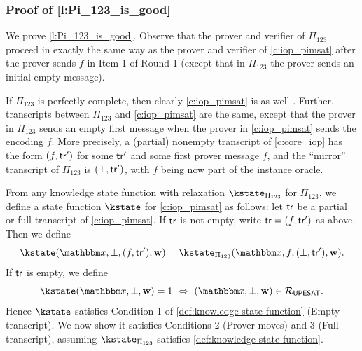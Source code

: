 \documentclass[11pt,letterpaper,usenames,dvipsnames]{article}
\begin{document}

%

\subsubsection{Proof of \cref{l:Pi_123_is_good}}\label{a:Pi_123_is_good}

 We prove \cref{l:Pi_123_is_good}. Observe that the prover and verifier of $\Pi_{123}$ proceed in exactly the same way as the prover and verifier of \cref{c:iop_pimsat} after the prover sends $f$ in Item 1 of Round 1 (except that in $\Pi_{123}$ the prover sends an initial empty message).  

If $\Pi_{123}$ is perfectly complete, then clearly \cref{c:iop_pimsat} is as well . Further,  transcripts between $\Pi_{123}$ and \cref{c:iop_pimsat} are the same, except that the prover in $\Pi_{123}$ sends an empty first message when the prover in \cref{c:iop_pimsat} sends the encoding $f$. More precisely, a (partial) nonempty transcript of \cref{c:core_iop} has the form $(f,\mathsf{tr}')$ for some $\mathsf{tr}'$ and some first prover message $f$, and the ``mirror'' transcript of $\Pi_{123}$ is $(\bot,\mathsf{tr}')$, with $f$ being now part of the instance oracle.

From any knowledge state function with relaxation $\kstate_{\Pi_{123}}$ for $\Pi_{123}$, we  define a state function $\kstate$ for \cref{c:iop_pimsat} as follows: let $\mathsf{tr}$ be a partial  or full transcript of \cref{c:iop_pimsat}. If $\mathsf{tr}$ is not empty, write $\mathsf{tr}=(f,\mathsf{tr}')$ as above. Then we define
%
$$
\kstate(\inp,\bot, (f,\tr'), \ww) = \kstate_{\Pi_{123}}(\inp, f, (\bot, \tr'), \ww).$$ 
%
If $\mathsf{tr}$ is empty, we define
%
$$
\kstate(\inp,\bot, \ww) = 1 \ \Leftrightarrow \ (\inp,\bot,\ww) \in \PIMSAT.
$$
%
Hence $\kstate$ satisfies Condition 1 of \cref{def:knowledge-state-function} (Empty transcript). We now show it satisfies Conditions 2 (Prover moves) and 3 (Full transcript), assuming $\kstate_{\Pi_{123}}$ satisfies \cref{def:knowledge-state-function}. 
\end{document}
